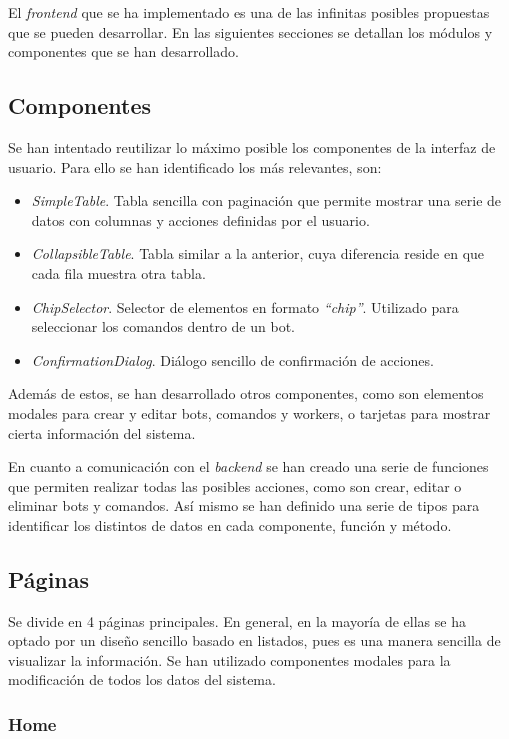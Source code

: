 El \textit{frontend} que se ha implementado es una de las infinitas posibles propuestas que se pueden desarrollar. En las siguientes secciones se detallan los módulos y componentes que se han desarrollado.

\subsection{Componentes}

Se han intentado reutilizar lo máximo posible los componentes de la interfaz de usuario. Para ello se han identificado los más relevantes, son:

\begin{itemize}
	\item \textit{SimpleTable}. Tabla sencilla con paginación que permite mostrar una serie de datos con columnas y acciones definidas por el usuario.
	\item \textit{CollapsibleTable}. Tabla similar a la anterior, cuya diferencia reside en que cada fila muestra otra tabla.
	\item \textit{ChipSelector}. Selector de elementos en formato \textit{``chip''}. Utilizado para seleccionar los comandos dentro de un bot.
	\item \textit{ConfirmationDialog}. Diálogo sencillo de confirmación de acciones.
\end{itemize}

Además de estos, se han desarrollado otros componentes, como son elementos modales para crear y editar bots, comandos y workers, o tarjetas para mostrar cierta información del sistema.

En cuanto a comunicación con el \textit{backend} se han creado una serie de funciones que permiten realizar todas las posibles acciones, como son crear, editar o eliminar bots y comandos. Así mismo se han definido una serie de tipos para identificar los distintos de datos en cada componente, función y método.

\subsection{Páginas}

Se divide en 4 páginas principales. En general, en la mayoría de ellas se ha optado por un diseño sencillo basado en listados, pues es una manera sencilla de visualizar la información. Se han utilizado componentes modales para la modificación de todos los datos del sistema.

\subsubsection{Home}

